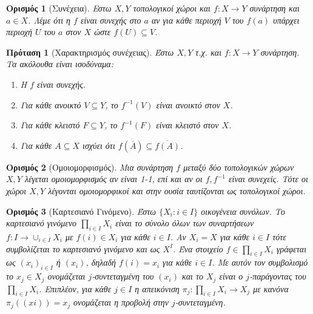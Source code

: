 \documentclass[oneside,a4paper]{article}
\newtheorem*{defn}{Ορισμός}
\newtheorem{prop}{Πρόταση}
\begin{document}
\vspace{0.1cm}

\begin{defn}[Συνέχεια]
	Εστω $X,Y$ τοπολογικοί χώροι και $f: X \rightarrow Y$ συνάρτηση και $a \in X$. Λέμε ότι η $f$ είναι συνεχής στο $a$ αν για κάθε περιοχή $V$ του $f(a)$ υπάρχει περιοχή $U$ του $a$ στον $X$ ώστε $f(U) \subseteq V$.
\end{defn}

\vspace{0.1cm}

\begin{prop}[Χαρακτηρισμός συνέχειας] Έστω $X,Y$ τ.χ. και $f:X \rightarrow Y$ συνάρτηση. Τα ακόλουθα είναι ισοδύναμα:
	\begin{enumerate}
		\item Η $f$ είναι συνεχής.
		\item Για κάθε ανοικτό $V \subseteq Y$, το $f^{-1} (V) $ είναι ανοικτό στον $X$.
		\item Για κάθε κλειστό $F \subseteq Y$, το $f^{-1}(F)$ είναι κλειστό στον $X$.
		\item Για κάθε $A \subseteq X$ ισχύει ότι $f(\overline{A}) \subseteq \overline{f(A)}$.
	\end{enumerate}
\end{prop}

\vspace{0.1cm}

\begin{defn}[Ομοιομορφισμός] Μια συνάρτηση $f$ μεταξύ δύο τοπολογικών χώρων $X,Y$ λέγεται ομοιομορφισμός αν είναι 1-1, επί και αν οι $f, f^{-1}$ είναι συνεχείς. Τότε οι χώροι $X,Y$ λέγονται ομοιομορφικοί και στην ουσία ταυτίζονται ως τοπολογικοί χώροι.
\end{defn}

\vspace{0.1cm}

\begin{defn}[Καρτεσιανό Γινόμενο]
	Έστω $\{X_i: i \in I\}$ οικογένεια συνόλων. Το καρτεσιανό γινόμενο $\prod\limits_{i \in I} X_i$ είναι το σύνολο όλων των συναρτήσεων $f: I \rightarrow \cup_{i \in I} X_i$ με $f(i) \in X_i$ για κάθε $i \in I$. Αν $X_i = X$ για κάθε $i \in I$ τότε συμβολίζεται το καρτεσιανό γινόμενο και ως $X^I$. Ένα στοιχείο $f \in \prod\limits_{i \in I} X_i$ γράφεται ως $(x_i)_{i \in I}$ ή $(x_i)$, δηλαδή $f(i) = x_i$ για κάθε $i \in I$. Με αυτόν τον συμβολισμό το $x_j \in X_j$ ονομάζεται $j$-συντεταγμένη του $(x_i)$ και το $X_j$ είναι ο $j$-παράγοντας του $\prod\limits_{i \in I} X_i$. Επιπλέον, για κάθε $j \in I$ η απεικόνιση $\pi_j : \prod\limits_{i \in I} X_i \rightarrow X_j$ με κανόνα $\pi_j ( (xi)) = x_j$ ονομάζεται η προβολή στην $j$-συντεταγμένη.
\end{defn}
\end{document}
